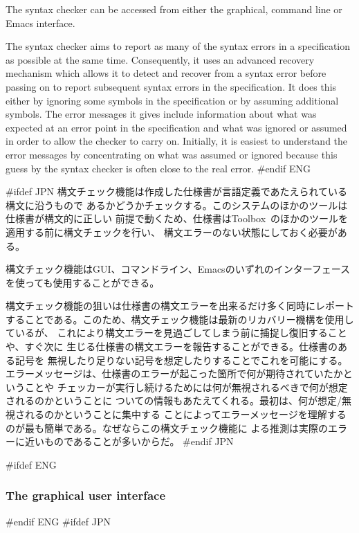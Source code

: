 \documentclass[\pformat,12pt]{article}
\newcommand{\Toolbox}{Toolbox}
\newcommand{\Toolbox}{Toolbox}
\begin{document}
The syntax checker can be accessed from either the graphical, command
line or Emacs interface.

The syntax checker aims to report as many of the syntax errors in a
specification as possible at the same time. Consequently, it uses an
advanced recovery mechanism which allows it to detect and recover from
a syntax error before passing on to report subsequent syntax errors in
the specification. It does this either by ignoring some symbols in the 
specification or by assuming additional symbols. The error messages it
gives 
include information about what was expected at an error point in the
specification and what was ignored or assumed in order to allow the
checker to carry on. Initially, it is easiest to understand the error
messages by concentrating on what was assumed or ignored because this
guess by the syntax checker is often close to the real error.
#endif ENG

#ifdef JPN
構文チェック機能は作成した仕様書が言語定義であたえられている構文に沿うもので
あるかどうかチェックする。このシステムのほかのツールは仕様書が構文的に正しい
前提で動くため、仕様書は\Toolbox\ のほかのツールを適用する前に構文チェックを行い、
構文エラーのない状態にしておく必要がある。

構文チェック機能はGUI、コマンドライン、Emacsのいずれのインターフェースを使っても使用することができる。

構文チェック機能の狙いは仕様書の構文エラーを出来るだけ多く同時にレポート
することである。このため、構文チェック機能は最新のリカバリー機構を使用しているが、
これにより構文エラーを見過ごしてしまう前に捕捉し復旧することや、すぐ次に
生じる仕様書の構文エラーを報告することができる。仕様書のある記号を
無視したり足りない記号を想定したりすることでこれを可能にする。
エラーメッセージは、仕様書のエラーが起こった箇所で何が期待されていたかということや
チェッカーが実行し続けるためには何が無視されるべきで何が想定されるのかということに
ついての情報もあたえてくれる。最初は、何が想定/無視されるのかということに集中する
ことによってエラーメッセージを理解するのが最も簡単である。なぜならこの構文チェック機能に
よる推測は実際のエラーに近いものであることが多いからだ。
#endif JPN

#ifdef ENG
\subsubsection{The graphical user interface}
#endif ENG
#ifdef JPN
\end{document}
